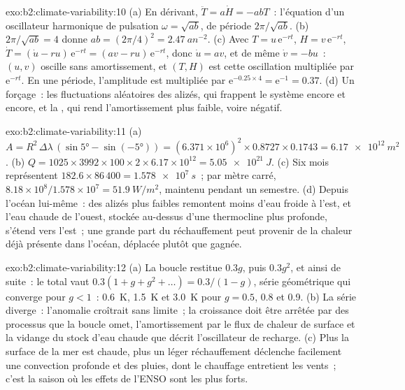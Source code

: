 \begin{solution}{exo:b2:climate-variability:10}
(a) En dérivant, $\ddot T = a\dot H = -abT$~: l'équation d'un oscillateur harmonique de pulsation
$\omega = \sqrt{ab}$, de période $2\pi/\sqrt{ab}$. (b) $2\pi/\sqrt{ab} = 4$ donne $ab =
(2\pi/4)^2 = \qty{2.47}{an^{-2}}$. (c) Avec $T = u\,\mathrm{e}^{-rt}$, $H = v\,\mathrm{e}^{-rt}$,
$\dot T = (\dot u - ru)\,\mathrm{e}^{-rt} = (av - ru)\,\mathrm{e}^{-rt}$, donc $\dot u = av$, et de même
$\dot v = -bu$~: $(u, v)$ oscille sans amortissement, et $(T, H)$ est cette oscillation multipliée par
$\mathrm{e}^{-rt}$. En une période, l'amplitude est multipliée par $\mathrm{e}^{-0.25 \times
4} = \mathrm{e}^{-1} = 0.37$. (d) Un forçage~: les fluctuations aléatoires des alizés, qui frappent le système
encore et encore, et la , qui rend l'amortissement plus faible,
voire négatif.
\end{solution}

\begin{solution}{exo:b2:climate-variability:11}
(a) $A = R^2 \,\Delta\lambda\,(\sin\ang{5} - \sin(\ang{-5})) = (6.371 \times 10^6)^2 \times 0.8727
\times 0.1743 = \qty{6.17e12}{m^2}$. (b) $Q = 1025 \times 3992 \times 100 \times 2 \times 6.17
\times 10^{12} = \qty{5.05e21}{J}$. (c) Six mois représentent $182.6 \times 86\,400 = \qty{1.578e7}{s}$~;
par mètre carré, $8.18 \times 10^8/1.578 \times 10^7 = \qty{51.9}{W/m^2}$, maintenu pendant un semestre.
(d) Depuis l'océan lui-même~: des alizés plus faibles remontent moins d'eau froide à l'est, et l'eau chaude de l'ouest,
stockée au-dessus d'une thermocline plus profonde, s'étend vers l'est~; une grande part du réchauffement
peut provenir de la chaleur déjà présente dans l'océan, déplacée plutôt que gagnée.
\end{solution}

\begin{solution}{exo:b2:climate-variability:12}
(a) La boucle restitue $0.3g$, puis $0.3g^2$, et ainsi de suite~: le total vaut $0.3(1 + g + g^2 + \dots) =
0.3/(1 - g)$, série géométrique qui converge pour $g < 1$~: \qty{0.6}{K}, \qty{1.5}{K} et
\qty{3.0}{K} pour $g = 0.5$, 0.8 et 0.9. (b) La série diverge~: l'anomalie croîtrait sans limite~; la croissance doit
être arrêtée par des processus que la boucle omet, l'amortissement par le flux de chaleur de surface et la vidange
du stock d'eau chaude que décrit l'oscillateur de recharge. (c) Plus la surface de la mer est chaude, plus un
léger réchauffement déclenche facilement une convection profonde et des pluies, dont le chauffage entretient les vents~;
c'est la saison où les effets de l'ENSO sont les plus forts.
\end{solution}

